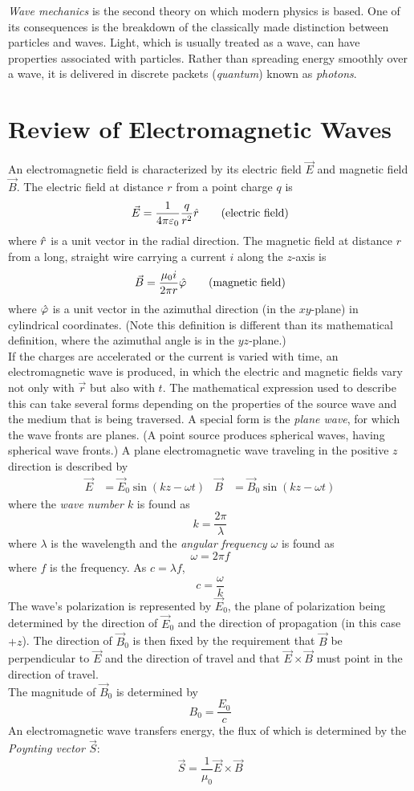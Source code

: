 \documentclass{subfiles}
\begin{document}
	\textit{Wave mechanics} is the second theory on which modern physics is based. One of its consequences is the breakdown of the classically made distinction between particles and waves. Light, which is usually treated as a wave, can have properties associated with particles. Rather than spreading energy smoothly over a wave, it is delivered in discrete packets (\textit{quantum}) known as \textit{photons}.
	\section{Review of Electromagnetic Waves}
		An electromagnetic field is characterized by its electric field \(\vec{E}\) and magnetic field \(\vec{B}\). The electric field at distance \(r\) from a point charge \(q\) is
			\[\vec{E} = \frac{1}{4\pi\varepsilon_0}\frac{q}{r^2}\hat{r} \tag{electric field}\]
			where \(\hat{r}\) is a unit vector in the radial direction. The magnetic field at distance \(r\) from a long, straight wire carrying a current \(i\) along the \(z\)-axis is
			\[\vec{B} = \frac{\mu_0i}{2\pi r}\hat{\varphi} \tag{magnetic field}\]
			where \(\hat{\varphi}\) is a unit vector in the azimuthal direction (in the \(xy\)-plane) in cylindrical coordinates. (Note this definition is different than its mathematical definition, where the azimuthal angle is in the \(yz\)-plane.) \\
			If the charges are accelerated or the current is varied with time, an electromagnetic wave is produced, in which the electric and magnetic fields vary not only with \(\vec{r}\) but also with \(t\). The mathematical expression used to describe this can take several forms depending on the properties of the source wave and the medium that is being traversed. A special form is the \textit{plane wave}, for which the wave fronts are planes. (A point source produces spherical waves, having spherical wave fronts.) A plane electromagnetic wave traveling in the positive \(z\) direction is described by
			\begin{align*}
				\vec{E} &= \vec{E}_0\sin(kz - \omega t) &
					\vec{B} &= \vec{B}_0\sin(kz - \omega t)
						\tag{planar wave}	
			\end{align*}
			where the \textit{wave number \(k\)} is found as
			\[k = \frac{2\pi}{\lambda} \tag{wave number}\]
			where \(\lambda\) is the wavelength and the \textit{angular frequency \(\omega\)} is found as
			\[\omega = 2\pi f \tag{angular frequency}\]
			where \(f\) is the frequency. As \(c = \lambda f\),
			\[c = \frac{\omega}{k}\]
			The wave's polarization is represented by \(\vec{E}_0\), the plane of polarization being determined by the direction of \(\vec{E}_0\) and the direction of propagation (in this case \(+z\)). The direction of \(\vec{B}_0\) is then fixed by the requirement that \(\vec{B}\) be perpendicular to \(\vec{E}\) and the direction of travel and that \(\vec{E} \times \vec{B}\) must point in the direction of travel. \\
			The magnitude of \(\vec{B}_0\) is determined by
			\[B_0 = \frac{E_0}{c}\]
			An electromagnetic wave transfers energy, the flux of which is determined by the \textit{Poynting vector \(\vec{S}\)}:
			\[\vec{S} = \frac{1}{\mu_0}\vec{E} \times \vec{B} \tag{Ponyting vector}\]
\end{document}
